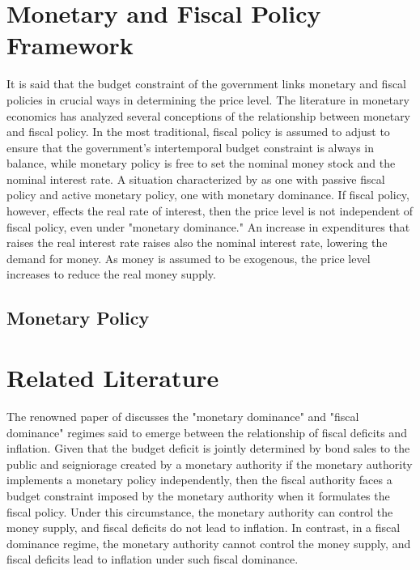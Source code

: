 \documentclass[12pt, titlepage]{article}
\numberwithin{equation}{section}
\begin{document}
\section{Monetary and Fiscal Policy Framework}

It is said that the budget constraint of the government links monetary and fiscal policies in crucial ways in determining the price level. The literature in monetary economics has analyzed several conceptions of the relationship
between monetary and fiscal policy. In the most traditional, fiscal policy is assumed to adjust
to ensure that the government’s intertemporal budget constraint is always in balance, while
monetary policy is free to set the nominal money stock and the nominal interest rate. A
situation characterized by \cite{Leeper91} as one with passive fiscal policy and active monetary
policy, one with monetary dominance. If fiscal policy, however, effects the real rate of interest,
then the price level is not independent of fiscal policy, even under "monetary dominance."
An increase in expenditures that raises the real interest rate raises also the nominal interest
rate, lowering the demand for money. As money is assumed to be exogenous, the price level
increases to reduce the real money supply.

\subsection{Monetary Policy}

\section{Related Literature}

The renowned paper of \cite{Sargent81} discusses
the "monetary dominance" and "fiscal dominance" regimes said to emerge between the relationship of fiscal deficits  and inflation. Given that the budget deficit is jointly determined by bond sales to the public and seigniorage created by a monetary authority if the monetary authority implements a monetary policy independently, then the fiscal authority faces a budget constraint imposed by the monetary authority when it formulates the fiscal policy. Under this circumstance, the monetary authority can control the money supply, and fiscal deficits do not lead to inflation. In contrast, in a fiscal dominance regime, the monetary authority cannot control the money supply, and fiscal deficits lead to inflation under such fiscal dominance. 
\end{document}
